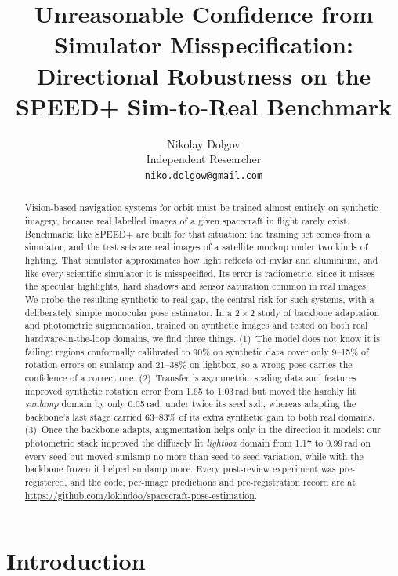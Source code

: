\documentclass{article}
\title{Unreasonable Confidence from Simulator Misspecification: Directional Robustness on the SPEED+ Sim-to-Real Benchmark}
\author{%
  Nikolay Dolgov\\
  Independent Researcher\\
  \texttt{niko.dolgow@gmail.com}
}
\begin{document}
\maketitle

\begin{abstract}
Vision-based navigation systems for orbit must be trained almost entirely on synthetic
imagery, because real labelled images of a given spacecraft in flight rarely exist.
Benchmarks like SPEED+ are built for that situation: the training set comes from a
simulator, and the test sets are real images of a satellite mockup under two kinds of
lighting. That simulator approximates how light reflects off mylar and aluminium, and like
every scientific simulator it is misspecified. Its error is radiometric, since it misses the
specular highlights, hard shadows and sensor saturation common in real images. We probe the resulting synthetic-to-real gap, the central risk for such systems,
with a deliberately simple monocular pose estimator. In a $2{\times}2$ study of backbone
adaptation and photometric augmentation, trained on synthetic images and tested on both real
hardware-in-the-loop domains, we find three things. (1)~The model does not know it is
failing: regions conformally calibrated to 90\% on synthetic data cover only 9--15\% of
rotation errors on sunlamp and 21--38\% on lightbox, so a wrong pose carries the confidence of
a correct one. (2)~Transfer is asymmetric: scaling data and features improved synthetic
rotation error from 1.65 to 1.03\,rad but moved the harshly lit \emph{sunlamp} domain by only
0.05\,rad, under twice its seed s.d., whereas adapting the backbone's last stage carried
63--83\% of its extra synthetic gain to both real domains. (3)~Once the backbone
adapts, augmentation helps only in the direction it models: our photometric stack improved the
diffusely lit \emph{lightbox} domain from 1.17 to 0.99\,rad on every seed but moved sunlamp no
more than seed-to-seed variation, while with the backbone frozen it helped sunlamp more. Every
post-review experiment was pre-registered, and the code, per-image predictions and
pre-registration record are at \url{https://github.com/lokindoo/spacecraft-pose-estimation}.
\end{abstract}

\section{Introduction}
\label{sec:intro}
\end{document}
